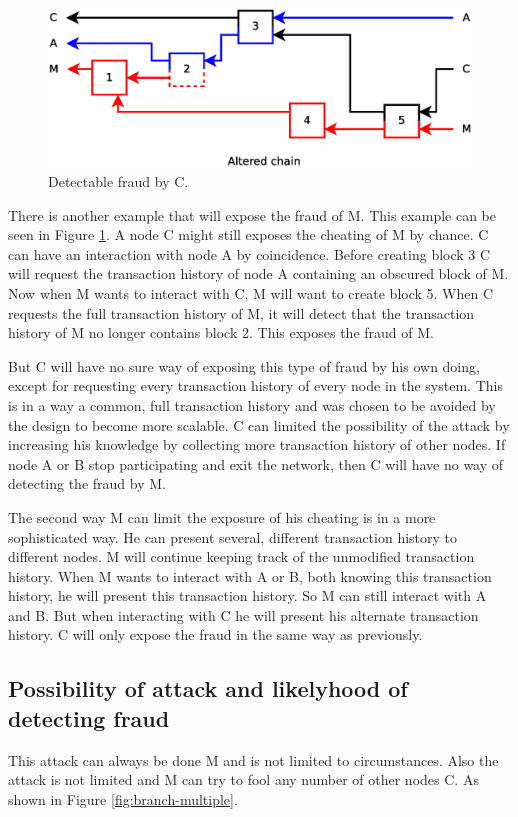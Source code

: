 \begin{figure}
	\centerline{\includegraphics[scale=0.3]{problems/figs/branch-fraud-detected.eps}}
	\caption{Detectable fraud by C.}
	\label{fig:problem-branch-preknowledge}
\end{figure}

There is another example that will expose the fraud of M.
This example can be seen in Figure \ref{fig:problem-branch-preknowledge}.
A node C might still exposes the cheating of M by chance.
C can have an interaction with node A by coincidence.
Before creating block 3 C will request the transaction history of node A containing an obscured block of M.
Now when M wants to interact with C, M will want to create block 5.
When C requests the full transaction history of M, it will detect that the transaction history of M no longer contains block 2.
This exposes the fraud of M.

But C will have no sure way of exposing this type of fraud by his own doing,
except for requesting every transaction history of every node in the system.
This is in a way a common, full transaction history and was chosen to be avoided by the design to become more scalable.
C can limited the possibility of the attack by increasing his knowledge by collecting more transaction history of other nodes.
If node A or B stop participating and exit the network,
then C will have no way of detecting the fraud by M.

The second way M can limit the exposure of his cheating is in a more sophisticated way.
He can present several, different transaction history to different nodes.
M will continue keeping track of the unmodified transaction history.
When M wants to interact with A or B, both knowing this transaction history, he will present this transaction history.
So M can still interact with A and B.
But when interacting with C he will present his alternate transaction history.
C will only expose the fraud in the same way as previously.

\subsection{Possibility of attack and likelyhood of detecting fraud}
This attack can always be done M and is not limited to circumstances.
Also the attack is not limited and M can try to fool any number of other nodes C.
As shown in Figure \ref{fig:branch-multiple}.

